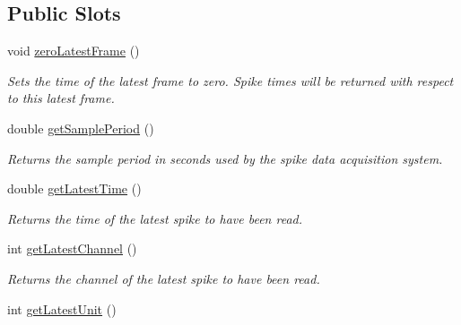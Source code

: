 \subsection*{Public Slots}
\begin{DoxyCompactItemize}
\item 
\hypertarget{class_picto_1_1_analysis_spike_data_ab7785ff34229a62a7edf25a37a2e97a5}{void \hyperlink{class_picto_1_1_analysis_spike_data_ab7785ff34229a62a7edf25a37a2e97a5}{zero\-Latest\-Frame} ()}\label{class_picto_1_1_analysis_spike_data_ab7785ff34229a62a7edf25a37a2e97a5}

\begin{DoxyCompactList}\small\item\em Sets the time of the latest frame to zero. Spike times will be returned with respect to this latest frame. \end{DoxyCompactList}\item 
\hypertarget{class_picto_1_1_analysis_spike_data_afa42d7bfc42be9d1927363e7d360cb02}{double \hyperlink{class_picto_1_1_analysis_spike_data_afa42d7bfc42be9d1927363e7d360cb02}{get\-Sample\-Period} ()}\label{class_picto_1_1_analysis_spike_data_afa42d7bfc42be9d1927363e7d360cb02}

\begin{DoxyCompactList}\small\item\em Returns the sample period in seconds used by the spike data acquisition system. \end{DoxyCompactList}\item 
\hypertarget{class_picto_1_1_analysis_spike_data_ae35e032169c1741d1334f8da44a83934}{double \hyperlink{class_picto_1_1_analysis_spike_data_ae35e032169c1741d1334f8da44a83934}{get\-Latest\-Time} ()}\label{class_picto_1_1_analysis_spike_data_ae35e032169c1741d1334f8da44a83934}

\begin{DoxyCompactList}\small\item\em Returns the time of the latest spike to have been read. \end{DoxyCompactList}\item 
\hypertarget{class_picto_1_1_analysis_spike_data_a76bf7b914f883f13018667d35a8955e6}{int \hyperlink{class_picto_1_1_analysis_spike_data_a76bf7b914f883f13018667d35a8955e6}{get\-Latest\-Channel} ()}\label{class_picto_1_1_analysis_spike_data_a76bf7b914f883f13018667d35a8955e6}

\begin{DoxyCompactList}\small\item\em Returns the channel of the latest spike to have been read. \end{DoxyCompactList}\item 
\hypertarget{class_picto_1_1_analysis_spike_data_a3a797dd7bd8aa22e01807aaa0b58c52e}{int \hyperlink{class_picto_1_1_analysis_spike_data_a3a797dd7bd8aa22e01807aaa0b58c52e}{get\-Latest\-Unit} ()}\label{class_picto_1_1_analysis_spike_data_a3a797dd7bd8aa22e01807aaa0b58c52e}


\end{DoxyCompactItemize}
